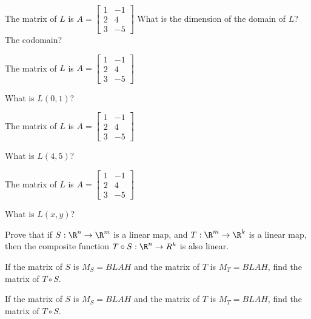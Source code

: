 	\begin{question}
		The matrix of $L$ is 
		$A = \begin{bmatrix}
		1&-1\\2&4\\3&-5
		\end{bmatrix}$
		What is the dimension of the domain of  $L$?  The codomain?
	\end{question}
	
	\begin{question}
		The matrix of $L$ is 
		$A = \begin{bmatrix}
		1&-1\\2&4\\3&-5
		\end{bmatrix}$
		
		What is $L(0,1)$?
	\end{question}
	
	\begin{question}
		The matrix of $L$ is 
		$A = \begin{bmatrix}
		1&-1\\2&4\\3&-5
		\end{bmatrix}$
		
		What is $L(4,5)$?
	\end{question}
	
	\begin{question}
		The matrix of $L$ is 
		$A = \begin{bmatrix}
		1&-1\\2&4\\3&-5
		\end{bmatrix}$
		
		What is $L(x,y)$?
	\end{question}

	\begin{question}
		Prove that if $S:\R^n \to \R^m$ is a linear map, and $T:\R^m \to \R^k$ is a linear map, then the composite function $T\circ S:\R^n \to R^k$ is also linear.
	\end{question}
	
	\begin{question}
		If the matrix of $S$ is $M_S = BLAH$ and the matrix of $T$ is $M_T = BLAH$, find the matrix of $T \circ S$.
	\end{question}
	
	\begin{question}
		If the matrix of $S$ is $M_S = BLAH$ and the matrix of $T$ is $M_T = BLAH$, find the matrix of $T \circ S$.
	\end{question}
	
